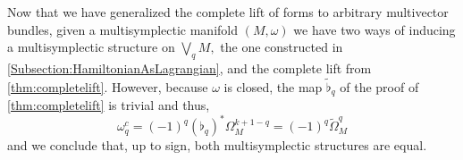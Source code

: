 \begin{remark}
    Now that we have generalized the complete lift of forms to arbitrary multivector bundles, given a multisymplectic manifold $(M, \omega)$ we have two ways of inducing a multisymplectic structure on $\bigvee_q M,$ the one constructed in \cref{Subsection:HamiltonianAsLagrangian}, and the complete lift from \cref{thm:completelift}. However, because $\omega$ is closed, the map $\widetilde{\flat}_q$ of the proof of \cref{thm:completelift} is trivial and thus, $$\omega^c_q = (-1)^q(\flat_q)^\ast \Omega_M^{k +1 - q} = (-1)^q \widetilde{\Omega}_M^q$$ and we conclude that, up to sign, both multisymplectic structures are equal.
\end{remark}

